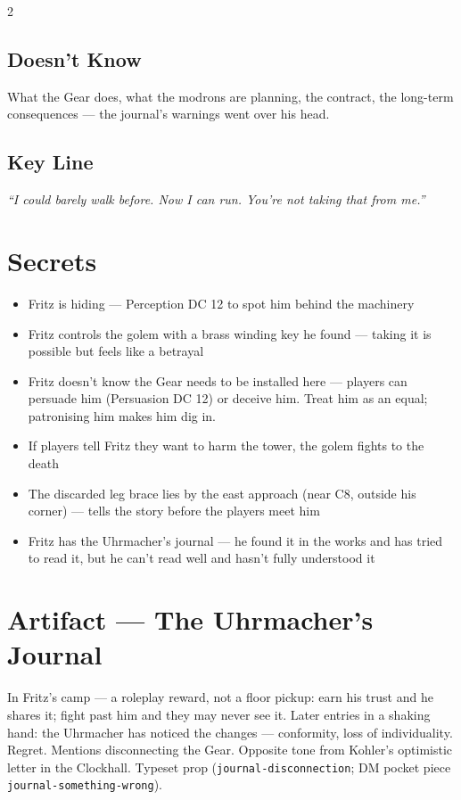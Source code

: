 \documentclass[10pt,letterpaper]{article}
\begin{document}
\begin{multicols}{2}
\subsection*{Doesn't Know}
What the Gear does, what the modrons are planning, the contract, the long-term consequences --- the journal's warnings went over his head.
\subsection*{Key Line}
\textit{``I could barely walk before. Now I can run. You're not taking that from me.''}

\columnbreak

\section*{Secrets}
\begin{itemize}
\item Fritz is hiding --- Perception DC 12 to spot him behind the machinery
\item Fritz controls the golem with a brass winding key he found --- taking it is possible but feels like a betrayal
\item Fritz doesn't know the Gear needs to be installed here --- players can persuade him (Persuasion DC 12) or deceive him. Treat him as an equal; patronising him makes him dig in.
\item If players tell Fritz they want to harm the tower, the golem fights to the death
\item The discarded leg brace lies by the east approach (near C8, outside his corner) --- tells the story before the players meet him
\item Fritz has the Uhrmacher's journal --- he found it in the works and has tried to read it, but he can't read well and hasn't fully understood it
\end{itemize}

\section*{Artifact --- The Uhrmacher's Journal}
In Fritz's camp --- a roleplay reward, not a floor pickup: earn his trust and he shares it; fight past him and they may never see it. Later entries in a shaking hand: the Uhrmacher has noticed the changes --- conformity, loss of individuality. Regret. Mentions disconnecting the Gear. Opposite tone from Kohler's optimistic letter in the Clockhall. Typeset prop (\texttt{journal-disconnection}; DM pocket piece \texttt{journal-something-wrong}).


\end{multicols}
\end{document}
